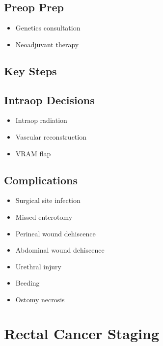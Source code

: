 \documentclass[
]{book}
\providecommand{\tightlist}{%
  \setlength{\itemsep}{0pt}\setlength{\parskip}{0pt}}
\begin{document}
\hypertarget{preop-prep}{%
\section{Preop Prep}\label{preop-prep}}

\begin{itemize}
\tightlist
\item
  Genetics consultation
\item
  Neoadjuvant therapy
\end{itemize}

\hypertarget{key-steps}{%
\section{Key Steps}\label{key-steps}}

\hypertarget{intraop-decisions}{%
\section{Intraop Decisions}\label{intraop-decisions}}

\begin{itemize}
\tightlist
\item
  Intraop radiation
\item
  Vascular reconstruction
\item
  VRAM flap
\end{itemize}

\hypertarget{complications}{%
\section{Complications}\label{complications}}

\begin{itemize}
\tightlist
\item
  Surgical site infection
\item
  Missed enterotomy
\item
  Perineal wound dehiscence
\item
  Abdominal wound dehiscence
\item
  Urethral injury
\item
  Beeding
\item
  Ostomy necrosis
\end{itemize}

\hypertarget{rectal-cancer-staging}{%
\chapter{Rectal Cancer Staging}\label{rectal-cancer-staging}}
\end{document}
